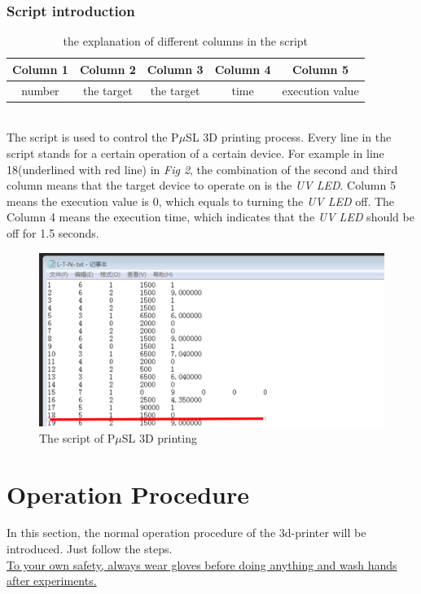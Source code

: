 \documentclass[a4paper]{article}
\begin{document}
\subsubsection{Script introduction}
\begin{table}[h!]
\caption{the explanation of different columns in the script}
\begin{center}
    \begin{tabular}{ | c | c | c | c | c |}
    \hline
    Column 1&Column 2&Column 3&Column 4&Column 5\\
    \hline
    number&the target&the target&time&execution value\\
    \hline
\end{tabular}
\end{center}
\end{table}\\
The script is used to control the P$\mu$SL 3D printing process. Every line in the script stands for a certain operation of a certain device. For example in line 18(underlined with red line) in \textit{Fig 2}, the combination of the second and third column means that the target device to operate on is the \textit{UV LED}. Column 5 means the execution value is 0, which equals to turning the \textit{UV LED} off. The Column 4 means the execution time, which indicates that the \textit{UV LED} should be off for 1.5 seconds.
\begin{figure}
\centering
\includegraphics{script22.png}
\caption{The script of P$\mu$SL 3D printing }
\end{figure}
\pagebreak





\section{Operation Procedure}\label{sec:page-layout}
	In this section, the normal operation procedure of the 3d-printer will be introduced. Just follow the steps. \\
	\underline {To your own safety, always wear gloves before doing anything and wash hands after experiments.}
\end{document}
